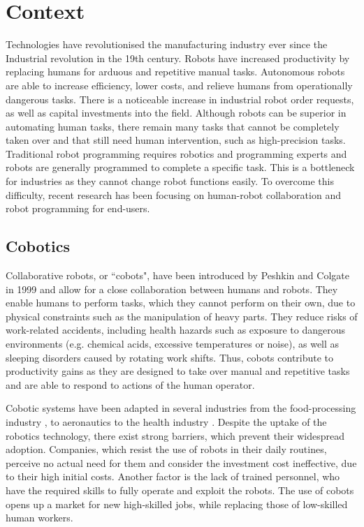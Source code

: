 \section{Context}
Technologies have revolutionised the manufacturing industry ever since the Industrial revolution in the 19th century.
Robots have increased productivity by replacing humans for arduous and repetitive manual tasks.
Autonomous robots are able to increase efficiency, lower costs, and relieve humans from operationally dangerous tasks.
There is a noticeable increase in industrial robot order requests, as well as capital investments into the field.
Although robots can be superior in automating human tasks, there remain many tasks that cannot be completely taken over and that still need human intervention, such as high-precision tasks.
Traditional robot programming requires robotics and programming experts and robots are generally programmed to complete a specific task.
This is a bottleneck for industries as they cannot change robot functions easily.
To overcome this difficulty, recent research has been focusing on human-robot collaboration and robot programming for end-users.


\subsection{Cobotics}\label{subsec:Cobotics}
Collaborative robots, or ``cobots", have been introduced by Peshkin and Colgate in 1999 \cite{colgate1999cobots} and allow for a close collaboration between humans and robots.
They enable humans to perform tasks, which they cannot perform on their own, due to physical constraints such as the manipulation of heavy parts.
They reduce risks of work-related accidents, including health hazards such as exposure to dangerous environments (e.g. chemical acids, excessive temperatures or noise), as well as sleeping disorders caused by rotating work shifts.
Thus, cobots contribute to productivity gains as they are designed to take over manual and repetitive tasks and are able to respond to actions of the human operator.

Cobotic systems have been adapted in several industries from the food-processing industry \cite{Food}, to aeronautics \cite{Airbus} to the health industry \cite{Ebola}.
Despite the uptake of the robotics technology, there exist strong barriers, which prevent their widespread adoption.
Companies, which resist the use of robots in their daily routines, perceive no actual need for them and consider the investment cost ineffective, due to their high initial costs.
Another factor is the lack of trained personnel, who have the required skills to fully operate and exploit the robots.
The use of cobots opens up a market for new high-skilled jobs, while replacing those of low-skilled human workers.

